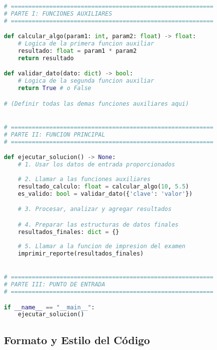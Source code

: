 \documentclass[11pt,a4paper]{article}
\begin{document}
\begin{lstlisting}[language=Python]
# ==========================================================
# PARTE I: FUNCIONES AUXILIARES
# ==========================================================

def calcular_algo(param1: int, param2: float) -> float:
    # Logica de la primera funcion auxiliar
    resultado: float = param1 * param2
    return resultado

def validar_dato(dato: dict) -> bool:
    # Logica de la segunda funcion auxiliar
    return True # o False

# (Definir todas las demas funciones auxiliares aqui)


# ==========================================================
# PARTE II: FUNCION PRINCIPAL
# ==========================================================

def ejecutar_solucion() -> None:
    # 1. Usar los datos de entrada proporcionados
    
    # 2. Llamar a las funciones auxiliares
    resultado_calculo: float = calcular_algo(10, 5.5)
    es_valido: bool = validar_dato({'clave': 'valor'})

    # 3. Procesar, analizar y agregar resultados

    # 4. Preparar las estructuras de datos finales
    resultados_finales: dict = {}
    
    # 5. Llamar a la funcion de impresion del examen
    imprimir_reporte(resultados_finales)


# ==========================================================
# PARTE III: PUNTO DE ENTRADA
# ==========================================================

if __name__ == "__main__":
    ejecutar_solucion()
\end{lstlisting}

\subsection{Formato y Estilo del Código}
\end{document}
